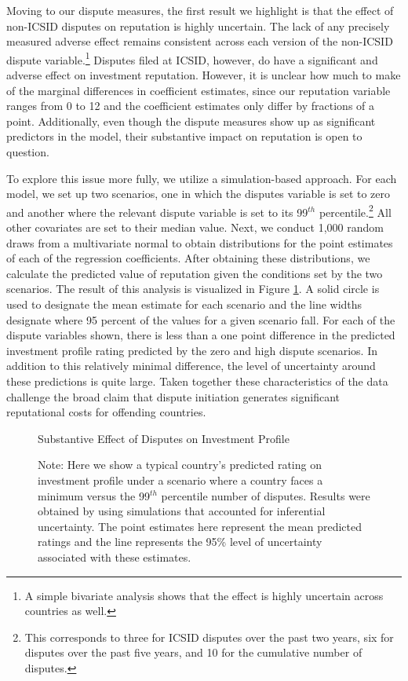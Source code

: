 \documentclass[12pt,onesided]{amsart}
\begin{document}
Moving to our dispute measures, the first result we highlight is that the effect of non-ICSID disputes on reputation is highly uncertain. The lack of any precisely measured adverse effect remains consistent across each version of the non-ICSID dispute variable.\footnote{A simple bivariate analysis shows that the effect is highly uncertain across countries as well.} Disputes filed at ICSID, however, do have a significant and adverse effect on investment reputation. However, it is unclear how much to make of the marginal differences in coefficient estimates, since our reputation variable ranges from 0 to 12 and the coefficient estimates only differ by fractions of a point. Additionally, even though the dispute measures show up as significant predictors in the model, their substantive impact on reputation is open to question. 

To explore this issue more fully, we utilize a simulation-based approach. For each model, we set up two scenarios, one in which the disputes variable is set to zero and another where the relevant dispute variable is set to its 99$^{th}$ percentile.\footnote{This corresponds to three for ICSID disputes over the past two years, six for disputes over the past five years, and 10 for the cumulative number of disputes.} All other covariates are set to their median value. Next, we conduct 1,000 random draws from a multivariate normal to obtain distributions for the point estimates of each of the regression coefficients. After obtaining these distributions, we calculate the predicted value of reputation given the conditions set by the two scenarios. The result of this analysis is visualized in Figure \ref{fig:subEffect}. A solid circle is used to designate the mean estimate for each scenario and the line widths designate where 95 percent of the values for a given scenario fall. For each of the dispute variables shown, there is less than a one point difference in the predicted investment profile rating predicted by the zero and high dispute scenarios. In addition to this relatively minimal difference, the level of uncertainty around these predictions is quite large. Taken together these characteristics of the data challenge the broad claim that dispute initiation generates significant reputational costs for offending countries.

\begin{figure}[ht]
	\centering
	\caption{Substantive Effect of Disputes on Investment Profile}
	\label{fig:subEffect}
	\resizebox{1\textwidth}{!}{}
	\caption*{Note: Here we show a typical country's predicted rating on investment profile under a scenario where a country faces a minimum versus the 99$^{th}$ percentile number of disputes. Results were obtained by using simulations that accounted for inferential uncertainty. The point estimates here represent the mean predicted ratings and the line represents the 95\% level of uncertainty associated with these estimates.}
\end{figure}
\FloatBarrier
\end{document}
